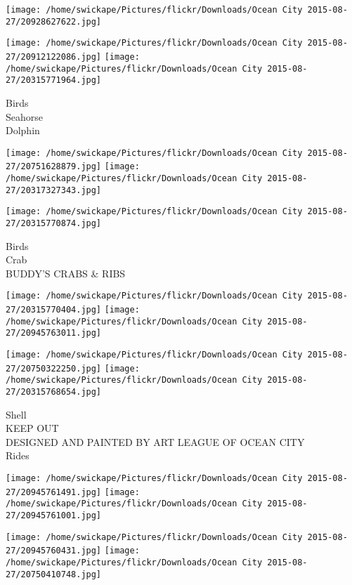 \documentclass[10pt,letterpaper]{article}
\begin{document}
\texttt{[image: /home/swickape/Pictures/flickr/Downloads/Ocean City 2015-08-27/20928627622.jpg]}

\vspace{0.25in}
\texttt{[image: /home/swickape/Pictures/flickr/Downloads/Ocean City 2015-08-27/20912122086.jpg]}
\texttt{[image: /home/swickape/Pictures/flickr/Downloads/Ocean City 2015-08-27/20315771964.jpg]}

Birds\\
Seahorse\\
Dolphin
\pagebreak

\texttt{[image: /home/swickape/Pictures/flickr/Downloads/Ocean City 2015-08-27/20751628879.jpg]}
\texttt{[image: /home/swickape/Pictures/flickr/Downloads/Ocean City 2015-08-27/20317327343.jpg]}

\vspace{0.25in}
\texttt{[image: /home/swickape/Pictures/flickr/Downloads/Ocean City 2015-08-27/20315770874.jpg]}

Birds\\
Crab\\
BUDDY'S CRABS \& RIBS
\pagebreak

\texttt{[image: /home/swickape/Pictures/flickr/Downloads/Ocean City 2015-08-27/20315770404.jpg]}
\texttt{[image: /home/swickape/Pictures/flickr/Downloads/Ocean City 2015-08-27/20945763011.jpg]}

\texttt{[image: /home/swickape/Pictures/flickr/Downloads/Ocean City 2015-08-27/20750322250.jpg]}
\texttt{[image: /home/swickape/Pictures/flickr/Downloads/Ocean City 2015-08-27/20315768654.jpg]}

Shell\\
KEEP OUT\\
DESIGNED AND PAINTED BY ART LEAGUE OF OCEAN CITY\\
Rides
\pagebreak

\texttt{[image: /home/swickape/Pictures/flickr/Downloads/Ocean City 2015-08-27/20945761491.jpg]}
\texttt{[image: /home/swickape/Pictures/flickr/Downloads/Ocean City 2015-08-27/20945761001.jpg]}

\texttt{[image: /home/swickape/Pictures/flickr/Downloads/Ocean City 2015-08-27/20945760431.jpg]}
\texttt{[image: /home/swickape/Pictures/flickr/Downloads/Ocean City 2015-08-27/20750410748.jpg]}
\end{document}
